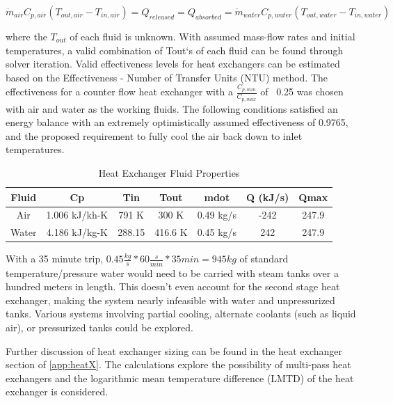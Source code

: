 \documentclass[heading.tex]{subfiles}
\begin{document}
\begin{equation}
\dot{m}_{air} C_{p, air} (T_{out, air} - T_{in, air}) = {Q}_{released} = {Q}_{absorbed}= \dot{m}_{water} C_{p,water} (T_{out, water} - T_{in, water})
\end{equation}

where the $T_{out}$  of each fluid is unknown. With assumed mass-flow rates and initial temperatures, a valid combination of Tout‘s of
each fluid can be found through solver iteration. Valid effectiveness levels for heat exchangers can be estimated based on the
Effectiveness - Number of Transfer Units (NTU) method. 
The effectiveness for a counter flow heat exchanger with a $\frac{C_{p,min}}{C_{p,max}}$ of ~0.25 was chosen with air and water as the working fluids. 
The following conditions satisfied an energy balance with an extremely optimistically assumed effectiveness of 0.9765,
and the proposed requirement to fully cool the air back down to inlet temperatures.


\begin{table} [H]
\centering
\begin{tabular}{|c|c|c|c|c|c|c|}
\hline 
Fluid & Cp & Tin & Tout & mdot & Q (kJ/s) & Qmax \\ 
\hline 
Air & 1.006 kJ/kh-K & 791 K & 300 K & 0.49 kg/s & -242 & 247.9 \\ 
\hline 
Water & 4.186 kJ/kg-K & 288.15 & 416.6 K  & 0.45 kg/s & 242 & 247.9 \\ 
\hline 
\end{tabular} 
 \caption{Heat Exchanger Fluid Properties}
\end{table}

With a 35 minute trip, $0.45 \frac{kg}{s} * 60 \frac{s}{min} * 35min = 945 kg$ of standard temperature/pressure water would need to be carried 
with steam tanks over a hundred meters in length. This doesn't even account for the second stage heat exchanger, making the system nearly infeasible
with water and unpressurized tanks. Various systems involving partial cooling, alternate coolants (such as liquid air), or pressurized tanks could be explored.

Further discussion of heat exchanger sizing can be found in the heat exchanger section of \cref{app:heatX}.
The calculations explore the possibility of multi-pass heat exchangers
and the logarithmic mean temperature difference (LMTD) of the heat exchanger is considered.
\cite{Cengal}
\cite{Turns}
\end{document}
